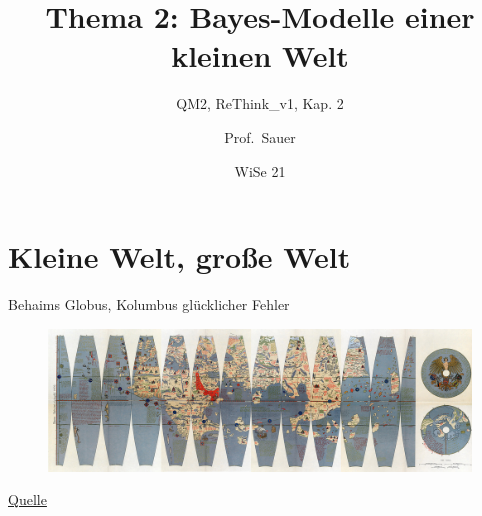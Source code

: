 \documentclass[
  ngerman,
  ignorenonframetext,
]{beamer}
\title{Thema 2: Bayes-Modelle einer kleinen Welt}
\subtitle{QM2, ReThink\_v1, Kap. 2}
\author{Prof.~Sauer}
\date{WiSe 21}
\institute{AWM, HS Ansbach}
\begin{document}
\frame{\titlepage}

\begin{frame}[allowframebreaks]
  \tableofcontents[hideallsubsections]
\end{frame}
\hypertarget{kleine-welt-grouxdfe-welt}{%
\section{Kleine Welt, große Welt}\label{kleine-welt-grouxdfe-welt}}

\begin{frame}{Behaims Globus, Kolumbus glücklicher Fehler}
\protect\hypertarget{behaims-globus-kolumbus-gluxfccklicher-fehler}{}
\begin{figure}[H]
\includegraphics[width=0.7\linewidth]{img/Behaim} \end{figure}

\href{https://de.wikipedia.org/wiki/Martin_Behaims_Erdapfel\#/media/Datei:RavensteinBehaim.jpg}{Quelle}
\end{frame}
\end{document}
